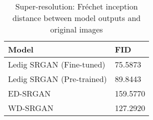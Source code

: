 \begin{table}[!htb]
\centering
\setlength{\tabcolsep}{8pt} %
\renewcommand{\arraystretch}{0.8} %
\begin{tabular}{p{} | p{} }
        \hline
        \hline
        \centering\footnotesize{\textbf{Model}} & \footnotesize{\textbf{FID}}\\
        \hline
        \centering\footnotesize{Ledig SRGAN (Fine-tuned)} & \footnotesize{75.5873}\\
        \centering\footnotesize{Ledig SRGAN (Pre-trained)} & \footnotesize{89.8443}\\
        \centering\footnotesize{ED-SRGAN} & \footnotesize{159.5770}\\
        \centering\footnotesize{WD-SRGAN} & \footnotesize{127.2920}\\
        \hline
    \end{tabular}
\caption{Super-resolution: Fréchet inception distance between model outputs and original images}
\label{tab:super-resolution_FID}
\end{table}